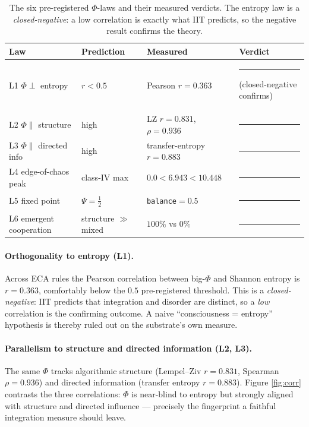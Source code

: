 \documentclass[11pt,a4paper]{article}
\newcommand{\tierdisc}[1]{\textcolor{#1}{\rule[0.05ex]{1.0ex}{1.0ex}}}
\newcommand{\tierBlue}{\tierdisc{blue!70!black}}
\newcommand{\tierGreen}{\tierdisc{green!60!black}}
\begin{document}
\begin{table}[h]
\centering
\caption{The six pre-registered $\Phi$-laws and their measured verdicts. The
entropy law is a \emph{closed-negative}: a low correlation is exactly what IIT
predicts, so the negative result confirms the theory.}
\label{tab:phi}
\small
\begin{tabular}{@{}llll@{}}
\toprule
Law & Prediction & Measured & Verdict \\
\midrule
L1 $\Phi\perp$ entropy & $r<0.5$ & Pearson $r=0.363$ & \tierGreen{} (closed-negative confirms) \\
L2 $\Phi\parallel$ structure & high & LZ $r=0.831$, $\rho=0.936$ & \tierGreen{} \\
L3 $\Phi\parallel$ directed info & high & transfer-entropy $r=0.883$ & \tierGreen{} \\
L4 edge-of-chaos peak & class-IV max & $0.0 < 6.943 < 10.448$ & \tierGreen{} \\
L5 fixed point & $\Psi=\tfrac12$ & \texttt{balance}$=0.5$ & \tierBlue{} \\
L6 emergent cooperation & structure $\gg$ mixed & $100\%$ vs $0\%$ & \tierGreen{} \\
\bottomrule
\end{tabular}
\end{table}

\paragraph{Orthogonality to entropy (L1).}
Across ECA rules the Pearson correlation between big-$\Phi$ and Shannon entropy
is $r=0.363$, comfortably below the $0.5$ pre-registered threshold. This is a
\emph{closed-negative}: IIT predicts that integration and disorder are distinct,
so a \emph{low} correlation is the confirming outcome. A naive ``consciousness =
entropy'' hypothesis is thereby ruled out on the substrate's own measure.

\paragraph{Parallelism to structure and directed information (L2, L3).}
The same $\Phi$ tracks algorithmic structure (Lempel--Ziv $r=0.831$, Spearman
$\rho=0.936$) and directed information (transfer entropy $r=0.883$). Figure
\ref{fig:corr} contrasts the three correlations: $\Phi$ is near-blind to entropy
but strongly aligned with structure and directed influence --- precisely the
fingerprint a faithful integration measure should leave.
\end{document}
